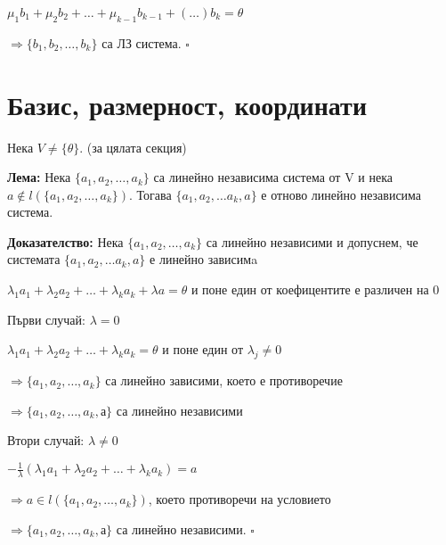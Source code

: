 \documentclass[fleqn,12pt]{article}
\begin{document}
\begin{flushleft}
$ \mu_1 b_1 + \mu_2 b_2 + \dots + \mu_{k-1} b_{k-1} + (\dots) b_k = \theta $

$ \Rightarrow \{ b_1, b_2, \dots, b_k \} $ са ЛЗ система. $\square$


\section{Базис, размерност, координати}
    Нека $ V \neq \{ \theta \} $. (за цялата секция)
    
    \vspace{5mm}
    
    \textbf{Лема:} Нека $\{a_1, a_2, \dots, a_k\}$ са линейно независима система от V и нека $ a \notin l(\{ a_1, a_2, \dots, a_k\}) $. Тогава $ \{a_1, a_2, \dots a_k, a \} $ е отново линейно независима система.

    \vspace{5mm}
    
    \textbf{Доказателство:} Нека $\{a_1, a_2, \dots, a_k\} $ са линейно независими и допуснем, че системата $ \{a_1, a_2, \dots a_k, a \} $ е линейно зависимa

    \vspace{5mm}
    
    $ \lambda_1 a_1 + \lambda_2 a_2 + \dots + \lambda_k a_k + \lambda a = \theta $ и поне един от коефицентите е различен на 0

    \vspace{5mm}
    
    Първи случай: $\lambda = 0 $

    $ \lambda_1 a_1 + \lambda_2 a_2 + \dots + \lambda_k a_k = \theta $ и поне един от $\lambda_j \neq 0 $

    $ \Rightarrow \{a_1, a_2, \dots, a_k\} $ са линейно зависими, което е противоречие
    
    $ \Rightarrow \{a_1, a_2, \dots, a_k, а\} $ са линейно независими

    \vspace{5mm}
    
    Втори случай: $\lambda \neq 0 $

    $ - \frac{1}{\lambda} ( \lambda_1 a_1 + \lambda_2 a_2 + \dots + \lambda_k a_k ) = a $ 

    $ \Rightarrow a \in l(\{a_1, a_2, \dots, a_k\}) $, което противоречи на условието
    
    $ \Rightarrow \{a_1, a_2, \dots, a_k, а\} $ са линейно независими. $\square$

    
    \vspace{5mm}
    

\end{flushleft}
\end{document}
